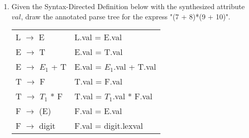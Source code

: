 \documentclass[10pt]{article}
\begin{document}
\begin{enumerate}
\begin{enumerate}
{\begin{center}
\end{center}
                    }
              \item Given the Syntax-Directed Definition below with the synthesized attribute $val$, draw the annotated
                    parse tree for the express "(7 + 8)*(9 + 10)".
                    \begin{table}[h]
                        \centering
                        \begin{tabular}{ll}
                            L $\rightarrow$ E           & L.val = E.val               \\
                            E $\rightarrow$ T           & E.val = T.val               \\
                            E $\rightarrow$ $E_{1}$ + T & E.val = $E_{1}$.val + T.val \\
                            T $\rightarrow$ F           & T.val = F.val               \\
                            T $\rightarrow$ $T_{1}$ * F & T.val = $T_{1}$.val * F.val \\
                            F $\rightarrow$ (E)         & F.val = E.val               \\
                            F $\rightarrow$ digit       & F.val = digit.lexval
                        \end{tabular}
                    \end{table}

\end{enumerate}
\end{enumerate}
\end{document}
